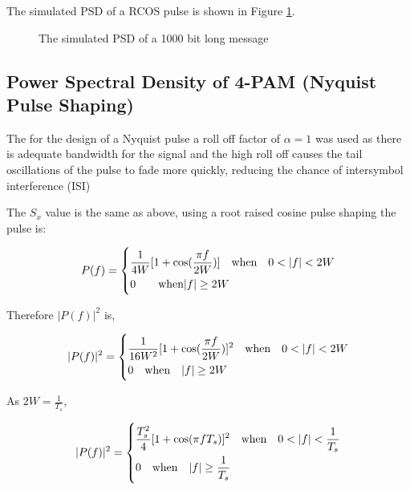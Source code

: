 The simulated PSD of a RCOS pulse is shown in Figure \ref{fig:sim-psd}.

\begin{figure}[H]
    \begin{center}
        
        \label{fig:sim-psd}
        \caption{The simulated PSD of a 1000 bit long message}
    \end{center}
\end{figure}

\subsection{Power Spectral Density of 4-PAM (Nyquist Pulse Shaping)}
The for the design of a Nyquist pulse a roll off factor of $\alpha = 1$ was used as there is adequate bandwidth
for the signal and the high roll off causes the tail oscillations of the pulse to fade more quickly, reducing the
chance of intersymbol interference (ISI)

The $S_x$ value is the same as above, using a root raised cosine pulse shaping the pulse is:

\begin{equation}
    \label{eqn:pf-w-niquist}
    P(f) =
    \begin{dcases}
        \frac{1}{4W} [1+\textrm{cos}(\frac{\pi f}{2W})] \quad \textrm{when} \quad 0<|f|<2W \\
        0 \quad \quad \textrm{when} |f| \geq 2W
    \end{dcases}
\end{equation}

Therefore $|P(f)|^2$ is,

\begin{equation}
    \label{eqn-pf2-nyquist}
    |P(f)|^2 =
    \begin{dcases}
        \frac{1}{16W^2}[1+\textrm{cos}(\frac{\pi f}{2W})]^2 \quad \textrm{when} \quad 0<|f|<2W \\
        0 \quad \textrm{when} \quad |f| \geq 2W
    \end{dcases}
\end{equation}

As $2W = \frac{1}{T_s}$,

\begin{equation}
    \label{eqn-pf2-nyquist-ts}
    |P(f)|^2 =
    \begin{dcases}
        \frac{T_s^2}{4}[1+\textrm{cos}(\pi f T_s)]^2 \quad \textrm{when} \quad 0<|f|<\frac{1}{T_s} \\
        0 \quad \textrm{when} \quad |f| \geq \frac{1}{T_s}
    \end{dcases}
\end{equation}

